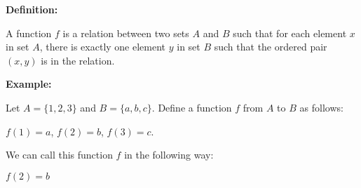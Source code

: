 \iffalse

Q. Define a function and call in tex.

\fi

\textbf{Definition:}

A function $f$ is a relation between two sets $A$ and $B$ such that for each element $x$ in set $A$, there is exactly one element $y$ in set $B$ such that the ordered pair $(x,y)$ is in the relation.

\textbf{Example:}

Let $A = \{1,2,3\}$ and $B = \{a,b,c\}$. Define a function $f$ from $A$ to $B$ as follows:

$f(1) = a$, $f(2) = b$, $f(3) = c$.

We can call this function $f$ in the following way:

$f(2) = b$